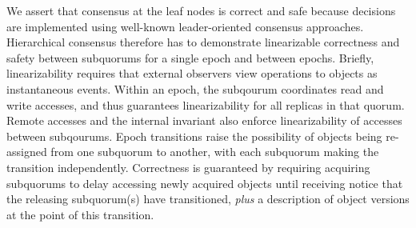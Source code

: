 \documentclass[11pt,letterpaper]{article}
\begin{document}
We assert that consensus at the leaf nodes is correct and safe because decisions are
implemented using well-known leader-oriented consensus approaches.
Hierarchical consensus therefore has to demonstrate linearizable correctness and safety
between subquorums for a single epoch and between epochs.
Briefly, linearizability requires that external observers view operations to objects as
instantaneous events.
Within an epoch, the subqourum coordinates read and write accesses, and thus guarantees
linearizability for all replicas in that quorum.
Remote accesses and the internal invariant also enforce linearizability of accesses
between subqourums.
Epoch transitions raise the possibility of objects being re-assigned from one subquorum to
another, with each subquorum making the transition independently. Correctness is
guaranteed by requiring acquiring subquorums to delay accessing newly acquired objects
until receiving notice that the releasing subquorum(s) have transitioned, \emph{plus} a
description of object versions at the point of this transition.
\end{document}
